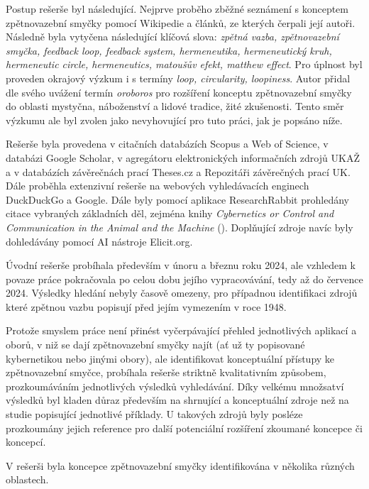 \documentclass[11pt,a4paper]{article}
\begin{document}
Postup rešerše byl následující. Nejprve proběho zběžné seznámení s konceptem zpětnovazební smyčky pomocí Wikipedie a článků, ze kterých čerpali její autoři. Následně byla vytyčena následující klíčová slova: \textit{zpětná vazba, zpětnovazební smyčka, feedback loop, feedback system, hermeneutika, hermeneutický kruh, hermeneutic circle, hermeneutics, matoušův efekt, matthew effect}. Pro úplnost byl proveden okrajový výzkum i s termíny \textit{loop, circularity, loopiness}. Autor přidal dle svého uvážení termín \textit{oroboros} pro rozšíření konceptu zpětnovazební smyčky do oblasti mystyčna, náboženství a lidové tradice, žité zkušenosti. Tento směr výzkumu ale byl zvolen jako nevyhovující pro tuto práci, jak je popsáno níže.

Rešerše byla provedena v citačních databázích Scopus a Web of Science, v databázi Google Scholar, v agregátoru elektronických informačních zdrojů UKAŽ a v databázích závěrečnách prací Theses.cz a Repozitáři závěrečných prací UK. Dále proběhla extenzivní rešerše na webových vyhledávacích enginech DuckDuckGo a Google. Dále byly pomocí aplikace ResearchRabbit prohledány citace vybraných základních děl, zejména knihy \textit{Cybernetics or Control and Communication in the Animal and the Machine} (\cite{wiener_cybernetics_2019}). Doplňující zdroje navíc byly dohledávány pomocí AI nástroje Elicit.org.

Úvodní rešerše probíhala především v únoru a březnu roku 2024, ale vzhledem k povaze práce pokračovala po celou dobu jejího vypracovávání, tedy až do července 2024. Výsledky hledání nebyly časově omezeny, pro případnou identifikaci zdrojů které zpětnou vazbu popisují před jejím vymezením v roce 1948.

Protože smyslem práce není přinést vyčerpávající přehled jednotlivých aplikací a oborů, v niž se dají zpětnovazební smyčky najít (ať už ty popisované kybernetikou nebo jinými obory), ale identifikovat konceptuální přístupy ke zpětnovazební smyčce, probíhala rešerše striktně kvalitativním způsobem, prozkoumáváním jednotlivých výsledků vyhledávání. Díky velkému množsatví výsledků byl kladen důraz především na shrnující a konceptuální zdroje než na studie popisující jednotlivé příklady. U takových zdrojů byly posléze prozkoumány jejich reference pro další potenciální rozšíření zkoumané koncepce či koncepcí.

V rešerši byla koncepce zpětnovazební smyčky identifikována v několika různých oblastech. 
\end{document}
